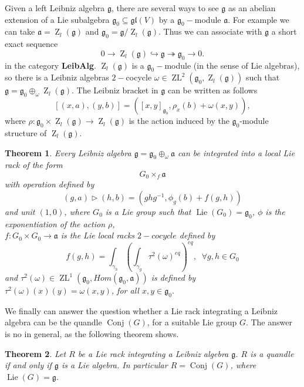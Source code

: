 \documentclass[english,4paper,10pt]{article}
\newcommand{\mg}{\mathfrak{g}}
\newtheorem{thm}{Theorem}[section]
\begin{document}
Given a left Leibniz algebra $\mathfrak{g}$, there are several ways to see $\mg$ as an abelian extension of a Lie subalgebra $\mg_0\subseteq \mathfrak{gl}(V)$ by a $\mg_0-$module $\mathfrak{a}$. For example we can take $\mathfrak{a}=\operatorname{Z}_l(\mg)$ and $\mg_0=\mg/\operatorname{Z}_l(\mg)$. Thus we can associate with $\mg$ a short exact sequence
$$
0\rightarrow \operatorname{Z}_l(\mg) \hookrightarrow \mg \twoheadrightarrow \mg_0 \rightarrow 0.
$$
in the category \textbf{LeibAlg}. $\operatorname{Z}_l(\mg)$ is a $\mg_0-$module (in the sense of Lie algebras), so there is a Leibniz algebras $2-$cocycle $\omega\in \operatorname{ZL}^2\left(\mg_0,\operatorname{Z}_l(\mg)\right)$ such that $\mg=\mg_0\oplus_\omega \operatorname{Z}_l(\mg)$. The Leibniz bracket in $\mg$ can be written as follows
$$
\left[\left(x,a\right),\left(y,b\right)\right]=\left(\left[x,y\right]_{\mg_0}, \rho_x(b)+\omega(x,y)\right),
$$
where $\rho\colon \mg_0\times \operatorname{Z}_l(\mg)\rightarrow \operatorname{Z}_l(\mg)$ is the action induced by the $\mg_0$-module structure of $\operatorname{Z}_l(\mg)$. 
\begin{thm}{\cite{covez2013local}}\label{thmcovez}
Every Leibniz algebra $\mg=\mg_0\oplus_\omega \mathfrak{a}$ can be integrated into a local Lie rack of the form 
$$
G_0\times_f \mathfrak{a}
$$
with operation defined by
$$
(g,a)\rhd (h,b)=\left(ghg^{-1}, \phi_g(b)+f(g,h)\right)
$$
and unit $(1,0)$, where $G_0$ is a Lie group such that $\operatorname{Lie}(G_0)=\mg_0$, $\phi$ is the exponentiation of the action $\rho$, \\$f\colon G_0\times G_0\rightarrow \mathfrak{a}$ is the Lie local racks $2-cocycle$ defined by 
$$
f(g,h)=\int_{\gamma_h}\left(\int_{\gamma_g}\tau^2(\omega)^{eq}\right)^{eq},\;\;\forall g,h\in G_0
$$
and $\tau^2(\omega)\in \operatorname{ZL}^1(\mg_0,Hom(\mg_0,\mathfrak{a}))$ is defined by $\tau^2(\omega)(x)(y)=\omega(x,y)$, for all $x,y\in\mg_0$.
\end{thm}

We finally can answer the question whether a Lie rack integrating a Leibniz algebra can be the quandle   $\operatorname{Conj}(G)$, for a suitable Lie group $G$. The answer is no in general, as the following theorem shows.

\begin{thm}\label{thm1}
	Let $R$ be a Lie rack integrating a Leibniz algebra $\mg$. $R$ is a quandle if and only if $\mg$ is a Lie algebra. In particular $R=\operatorname{Conj}(G)$, where $\operatorname{Lie}(G)=\mg$.
\end{thm}
\end{document}
